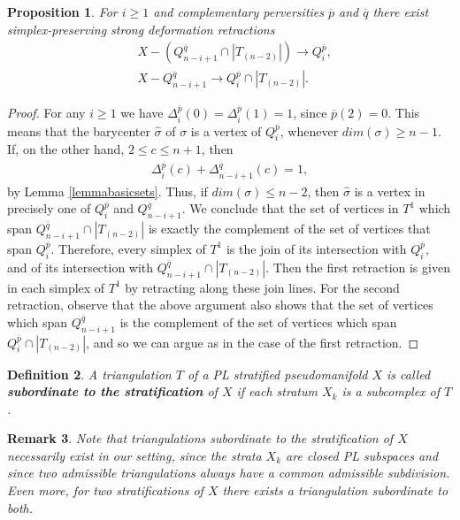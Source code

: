 \documentclass{scrreprt}
\newtheorem{prop}{Proposition}[chapter]
\newtheorem{definition}[prop]{Definition}
\newtheorem{remark}[prop]{Remark}
\begin{document}
\begin{prop}\label{retractions}
For $i \geq 1$ and complementary perversities $\overline{p}$ and $\overline{q}$ there exist simplex-preserving strong deformation retractions
\begin{align*}
&X-(Q_{n-i+1}^{\overline{q}} \cap |T_{(n-2)}|) \to Q_i^{\overline{p}} , \\
&X- Q_{n-i+1}^{\overline{q}} \to Q_i^{\overline{p}} \cap |T_{(n-2)}|.
\end{align*}
\end{prop}

\begin{proof}
For any $i \geq 1$ we have $\Delta_i^{\overline{p}}(0)=\Delta_i^{\overline{p}}(1)=1$, since $\overline{p}(2)=0$. This means that the barycenter $\hat{\sigma}$ of $\sigma$ is a vertex of $Q_i^{\overline{p}}$, whenever $dim(\sigma) \geq n-1$. If, on the other hand, $2 \leq c \leq n+1$, then
\begin{align*}
\Delta_i^{\overline{p}}(c)+ \Delta_{n-i+1}^{\overline{q}}(c)=1,
\end{align*}
by Lemma \ref{lemmabasicsets}. Thus, if $dim(\sigma) \leq n-2$, then $\hat{\sigma}$ is a vertex in precisely one of $Q_i^{\overline{p}}$ and $Q_{n-i+1}^{\overline{q}}$. We conclude that the set of vertices in $T^1$ which span $Q_{n-i+1}^{\overline{q}} \cap |T_{(n-2)}|$ is exactly the complement of the set of vertices that span $Q_i^{\overline{p}}$. Therefore, every simplex of $T^1$ is the join of its intersection with $Q_i^{\overline{p}}$, and of its intersection with $Q_{n-i+1}^{\overline{q}} \cap |T_{(n-2)}|$. Then the first retraction is given in each simplex of $T^1$ by retracting along these join lines. For the second retraction, observe that the above argument also shows that the set of vertices which span $Q_{n-i+1}^{\overline{q}}$ is the complement of the set of vertices which span $Q_i^{\overline{p}} \cap |T_{(n-2)}|$, and so we can argue as in the case of the first retraction.
\end{proof}

\begin{definition}
A triangulation $T$ of a PL stratified pseudomanifold $X$ is called \textbf{subordinate to the stratification} of $X$ if each stratum $X_k$ is a subcomplex of $T$.
\end{definition}

\begin{remark}
Note that triangulations subordinate to the stratification of $X$ necessarily exist in our setting, since the strata $X_k$ are closed PL subspaces and since two admissible triangulations always have a common admissible subdivision. Even more, for two stratifications of $X$ there exists a triangulation subordinate to both.
\end{remark}
\end{document}
